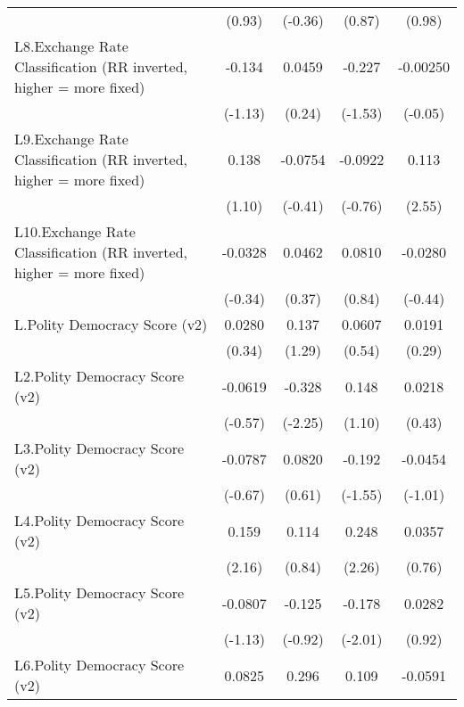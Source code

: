 {\begin{longtable}{l*{4}{c}}
                &   (0.93)         &  (-0.36)         &   (0.87)         &   (0.98)         \\
[1em]
L8.Exchange Rate Classification (RR inverted, higher = more fixed)&   -0.134         &   0.0459         &   -0.227         & -0.00250         \\
                &  (-1.13)         &   (0.24)         &  (-1.53)         &  (-0.05)         \\
[1em]
L9.Exchange Rate Classification (RR inverted, higher = more fixed)&    0.138         &  -0.0754         &  -0.0922         &    0.113\sym{*}  \\
                &   (1.10)         &  (-0.41)         &  (-0.76)         &   (2.55)         \\
[1em]
L10.Exchange Rate Classification (RR inverted, higher = more fixed)&  -0.0328         &   0.0462         &   0.0810         &  -0.0280         \\
                &  (-0.34)         &   (0.37)         &   (0.84)         &  (-0.44)         \\
[1em]
L.Polity Democracy Score (v2)&   0.0280         &    0.137         &   0.0607         &   0.0191         \\
                &   (0.34)         &   (1.29)         &   (0.54)         &   (0.29)         \\
[1em]
L2.Polity Democracy Score (v2)&  -0.0619         &   -0.328\sym{*}  &    0.148         &   0.0218         \\
                &  (-0.57)         &  (-2.25)         &   (1.10)         &   (0.43)         \\
[1em]
L3.Polity Democracy Score (v2)&  -0.0787         &   0.0820         &   -0.192         &  -0.0454         \\
                &  (-0.67)         &   (0.61)         &  (-1.55)         &  (-1.01)         \\
[1em]
L4.Polity Democracy Score (v2)&    0.159\sym{*}  &    0.114         &    0.248\sym{*}  &   0.0357         \\
                &   (2.16)         &   (0.84)         &   (2.26)         &   (0.76)         \\
[1em]
L5.Polity Democracy Score (v2)&  -0.0807         &   -0.125         &   -0.178\sym{*}  &   0.0282         \\
                &  (-1.13)         &  (-0.92)         &  (-2.01)         &   (0.92)         \\
[1em]
L6.Polity Democracy Score (v2)&   0.0825         &    0.296\sym{**} &    0.109         &  -0.0591         \\

\end{longtable}}
